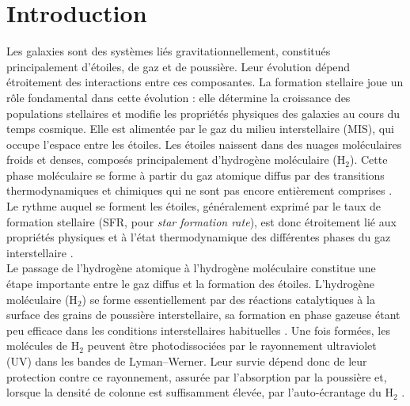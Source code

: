 \chapter[Introduction]{Introduction}
\label{Chap:Intro}
\makeatletter
\setlength{\@fptop}{0pt}
\makeatother

Les galaxies sont des systèmes liés gravitationnellement, constitués principalement d'étoiles, de gaz et de poussière. Leur évolution dépend étroitement des interactions entre ces composantes. La formation stellaire joue un rôle fondamental dans cette évolution : elle détermine la croissance des populations stellaires et modifie les propriétés physiques des galaxies au cours du temps cosmique. Elle est alimentée par le gaz du milieu interstellaire (MIS), qui occupe l'espace entre les étoiles. Les étoiles naissent dans des nuages moléculaires froids et denses, composés principalement d'hydrogène moléculaire (H$_2$). Cette phase moléculaire se forme à partir du gaz atomique diffus par des transitions thermodynamiques et chimiques qui ne sont pas encore entièrement comprises \citep{Kennicutt1998, Klessen2016}. Le rythme auquel se forment les étoiles, généralement exprimé par le taux de formation stellaire (SFR, pour \textit{star formation rate}), est donc étroitement lié aux propriétés physiques et à l'état thermodynamique des différentes phases du gaz interstellaire \citep{Fbigiel2008, Leroy2008}.\\\indent
Le passage de l'hydrogène atomique à l'hydrogène moléculaire constitue une étape importante entre le gaz diffus et la formation des étoiles. L'hydrogène moléculaire (H$_2$) se forme essentiellement par des réactions catalytiques à la surface des grains de poussière interstellaire, sa formation en phase gazeuse étant peu efficace dans les conditions interstellaires habituelles \citep{Gould1963, Hollenbach1971}. Une fois formées, les molécules de H$_2$ peuvent être photodissociées par le rayonnement ultraviolet (UV) dans les bandes de Lyman--Werner. Leur survie dépend donc de leur protection contre ce rayonnement, assurée par l'absorption par la poussière et, lorsque la densité de colonne est suffisamment élevée, par l'auto-écrantage du H$_2$ \citep{Draine1996, Krumholz2009, Sternberg2014}.\\\indent

